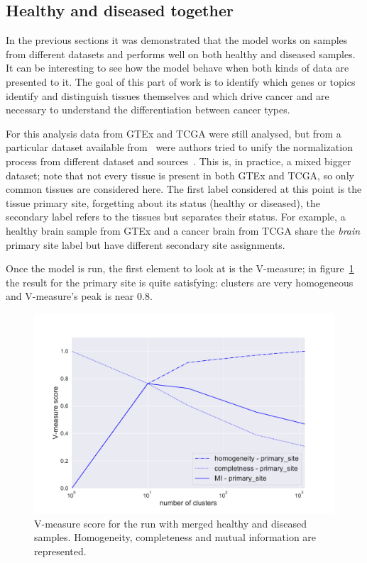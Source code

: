\subsection{Healthy and diseased together}
In the previous sections it was demonstrated that the model works on samples from different datasets and performs well on both healthy and diseased samples. It can be interesting to see how the model behave when both kinds of data are presented to it.
The goal of this part of work is to identify which genes or topics identify and distinguish tissues themselves and which drive cancer and are necessary to understand the differentiation between cancer types.

For this analysis data from GTEx and TCGA were still analysed, but from a particular dataset available from~\cite{Wang2017} were authors tried to unify the normalization process from different dataset and sources~\cite{Betel2018}. This is, in practice, a mixed bigger dataset; note that not every tissue is present in both GTEx and TCGA, so only common tissues are considered here. The first label considered at this point is the tissue primary site, forgetting about its status (healthy or diseased), the secondary label refers to the tissues but separates their status. For example, a healthy brain sample from GTEx and a cancer brain from TCGA share the \textit{brain} primary site label but have different secondary site assignments.

Once the model is run, the first element to look at is the V-measure; in figure~\ref{fig:topic/merged/metric_scores_primarysite} the result for the primary site is quite satisfying: clusters are very homogeneous and V-measure's peak is near $0.8$.
\begin{figure}[htb!]
    \centering
    \includegraphics[width=0.8\linewidth]{pictures/topic/merged/metric_scores_primarysite.pdf}
    \caption{V-measure score for the run with merged healthy and diseased samples. Homogeneity, completeness and mutual information are represented.}
    \label{fig:topic/merged/metric_scores_primarysite}
\end{figure}

